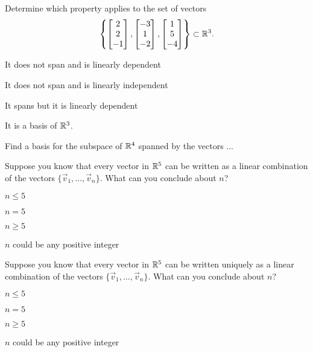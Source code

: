 \documentclass{article}
\begin{document}
\begin{readinessAssuranceTest}
\item Determine which property applies to the set of vectors $$\left\{ \begin{bmatrix}  2 \\ 2 \\ -1 \end{bmatrix}, \begin{bmatrix} -3 \\ 1 \\ -2 \end{bmatrix} , \begin{bmatrix} 1 \\ 5 \\ -4 \end{bmatrix}\right\}\subset \mathbb{R}^3.$$

\begin{readinessAssuranceTestChoices}
\item It does not span and is linearly dependent
\item It does not span and is linearly independent
\item It spans but it is linearly dependent
\item It is a basis of $\mathbb{R}^3$.
\end{readinessAssuranceTestChoices}


\item Find a basis for the subspace of $\mathbb{R}^4$ spanned by the vectors ...


\item Suppose you know that every vector in $\mathbb{R}^5$ can be written as a linear combination of the vectors $\{\vec{v}_1, \ldots, \vec{v}_n\}$.  What can you conclude about $n$?

\begin{readinessAssuranceTestChoices}
\item $n \leq 5$
\item $n=5$
\item $n \geq 5$
\item $n$ could be any positive integer
\end{readinessAssuranceTestChoices}

\item Suppose you know that every vector in $\mathbb{R}^5$ can be written uniquely as a linear combination of the vectors $\{\vec{v}_1, \ldots, \vec{v}_n\}$.  What can you conclude about $n$?

\begin{readinessAssuranceTestChoices}
\item $n \leq 5$
\item $n=5$
\item $n \geq 5$
\item $n$ could be any positive integer
\end{readinessAssuranceTestChoices}


\end{readinessAssuranceTest}
\end{document}
